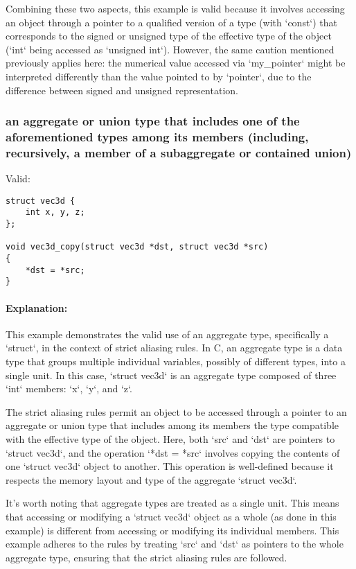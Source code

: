\documentclass[12pt]{article}
\begin{document}
Combining these two aspects, this example is valid because it involves accessing an object through a pointer to a qualified version of a type (with `const`) that corresponds to the signed or unsigned type of the effective type of the object (`int` being accessed as `unsigned int`). However, the same caution mentioned previously applies here: the numerical value accessed via `my\_pointer` might be interpreted differently than the value pointed to by `pointer`, due to the difference between signed and unsigned representation.

\subsubsection{an aggregate or union type that includes one of the aforementioned types among its members (including, recursively, a member of a subaggregate or contained union)}

Valid:
\begin{verbatim}
struct vec3d {
    int x, y, z;
};

void vec3d_copy(struct vec3d *dst, struct vec3d *src)
{
    *dst = *src;
}
\end{verbatim}

\paragraph{Explanation:}
This example demonstrates the valid use of an aggregate type, specifically a `struct`, in the context of strict aliasing rules. In C, an aggregate type is a data type that groups multiple individual variables, possibly of different types, into a single unit. In this case, `struct vec3d` is an aggregate type composed of three `int` members: `x`, `y`, and `z`.

The strict aliasing rules permit an object to be accessed through a pointer to an aggregate or union type that includes among its members the type compatible with the effective type of the object. Here, both `src` and `dst` are pointers to `struct vec3d`, and the operation `*dst = *src` involves copying the contents of one `struct vec3d` object to another. This operation is well-defined because it respects the memory layout and type of the aggregate `struct vec3d`.

It's worth noting that aggregate types are treated as a single unit. This means that accessing or modifying a `struct vec3d` object as a whole (as done in this example) is different from accessing or modifying its individual members. This example adheres to the rules by treating `src` and `dst` as pointers to the whole aggregate type, ensuring that the strict aliasing rules are followed.
\end{document}
